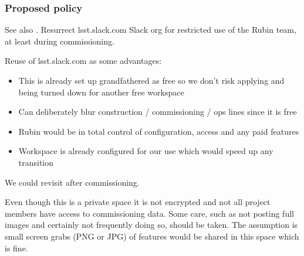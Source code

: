 \subsubsection{Proposed policy}
See also .
Resurrect lsst.slack.com Slack org for restricted use of the Rubin team, at least during commissioning.

Reuse of lsst.slack.com as some advantages:

\begin{itemize}
\item  This is already set up grandfathered as free so we don't risk applying and being turned down for another free workspace
\item  Can deliberately blur construction / commissioning / ops lines since it is free
\item  Rubin would be in total control of configuration, access and any paid features
\item  Workspace is already configured for our use which would speed up any transition

\end{itemize}
We could revisit after commissioning.

Even though this is a private space it is not encrypted and not all project members have access to commissioning data.
Some care, such as not posting full images and certainly not frequently doing so, should be taken.
The assumption is small screen grabs (PNG or JPG)  of features would be shared in this space which is fine.
